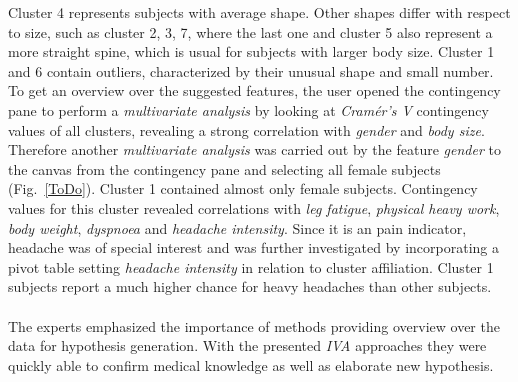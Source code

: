 \documentclass[journal]{style/vgtc} 			          %
\newcommand{\add}[1]{\textcolor{blue}{\uline{#1}}}
\newcommand{\com}[1]{\textcolor{orange}{\uline{#1}}}
\begin{document}
Cluster 4 represents subjects with average shape.
%
Other shapes differ with respect to size, such as cluster 2, 3, 7, where the last one and cluster 5 also represent a more straight spine, which is usual for subjects with larger body size.
%
Cluster 1 and 6 contain outliers, characterized by their unusual shape and small number.
%
%
To get an overview over the suggested features, the user opened the contingency pane to perform a \emph{multivariate analysis} by looking at \emph{Cram\'{e}r's V} contingency values of all clusters, revealing a strong correlation with \emph{gender} and \emph{body size}.
%
Therefore another \emph{multivariate analysis} was carried out by the feature \emph{gender} to the canvas from the contingency pane and selecting all female subjects (Fig.~\ref{ToDo}).
%
Cluster 1 contained almost only female subjects.
%
Contingency values for this cluster revealed correlations with \emph{leg fatigue}, \emph{physical heavy work}, \emph{body weight}, \emph{dyspnoea} and \emph{headache intensity}.
%
%
Since it is an pain indicator, headache was of special interest and was further investigated by incorporating a pivot table setting \emph{headache intensity} in relation to cluster affiliation.
%
Cluster 1 subjects report a much higher chance for heavy headaches than other subjects.
%
%
%
%
\\\\
The experts emphasized the importance of methods providing overview over the data for hypothesis generation.
%
With the presented \emph{IVA} approaches they were quickly able to confirm medical knowledge as well as elaborate new hypothesis.
\end{document}
